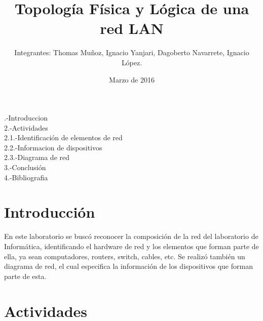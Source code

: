 \documentclass{udpreport}
\title{Topología Física y Lógica de una red LAN}
\author{Integrantes: Thomas Muñoz, Ignacio Yanjari, Dagoberto Navarrete, Ignacio López.}
\date{Marzo de 2016}
\begin{document}
\maketitle
{}.-Introduccion\\
2.-Actividades\\
2.1.-Identificación de elementos de red \\
2.2.-Informacion de dispositivos\\
2.3.-Diagrama de red\\
3.-Conclusión\\
4.-Bibliografia\\
\chapter{Introducción}
	        En este laboratorio se buscó reconocer la composición de la red del laboratorio de Informática, identificando el                      hardware de red y los elementos que forman parte de ella, ya sean computadores, routers, switch, cables, etc. Se                      realizó también un diagrama de red, el cual especifica la información de los dispositivos que forman parte de esta.
\chapter{Actividades}
\end{document}
